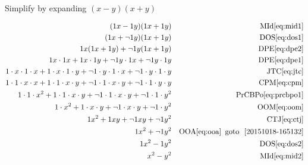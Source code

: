 \documentclass[20150903-160354-rs2.2-MarksMathNotebook.tex]{subfiles}
\begin{document}
\begin{example}[id:20151018-164638] \label{20151018-164638} \hfill \\
Simplify by expanding $(x-y)(x+y)$

\soln

\solnsteps
\begin{align*}
(1x-1y)(1x+1y) && \text{MId} \eqref{eq:mid1} \\
(1x+ \neg 1y)(1x+1y) && \text{DOS} \eqref{eq:dos1} \\
1x(1x+1y) + \neg 1y(1x+1y) && \text{DPE} \eqref{eq:dpe2} \\
1x \cdot 1x + 1x \cdot 1y + \neg 1y \cdot 1x + \neg 1y \cdot 1y && \text{DPE} \eqref{eq:dpe1} \\
1 \cdot x \cdot 1 \cdot x + 1 \cdot x \cdot 1 \cdot y + \neg 1 \cdot y \cdot 1 \cdot x + \neg 1 \cdot y \cdot 1 \cdot y && \text{JTC} \eqref{eq:jtc} \\
1 \cdot 1 \cdot x \cdot x + 1 \cdot 1 \cdot x \cdot y + \neg 1 \cdot 1 \cdot x \cdot y + \neg 1 \cdot 1 \cdot y \cdot y && \text{CPM} \eqref{eq:cpm} \\
1 \cdot 1 \cdot x^2 + 1 \cdot 1 \cdot x \cdot y + \neg 1 \cdot 1 \cdot x \cdot y + \neg 1 \cdot 1 \cdot y^2 && \text{PrCBPo} \eqref{eq:prcbpo1} \\
1\cdot x^2 + 1\cdot x \cdot y + \neg 1 \cdot x \cdot y + \neg 1 \cdot y^2 && \text{OOM} \eqref{eq:oom} \\
1x^2 + 1xy + \neg 1xy + \neg 1y^2 && \text{CTJ} \eqref{eq:ctj} \\
1x^2 + \neg 1y^2 && \text{OOA} \eqref{eq:ooa} \text{\, goto \,} \, \ref{20151018-165132}\\
1x^2 - 1y^2 && \text{DOS} \eqref{eq:dos2} \\
x^2-y^2 && \text{MId} \eqref{eq:mid2} 
\end{align*}
\end{example}
\end{document}
